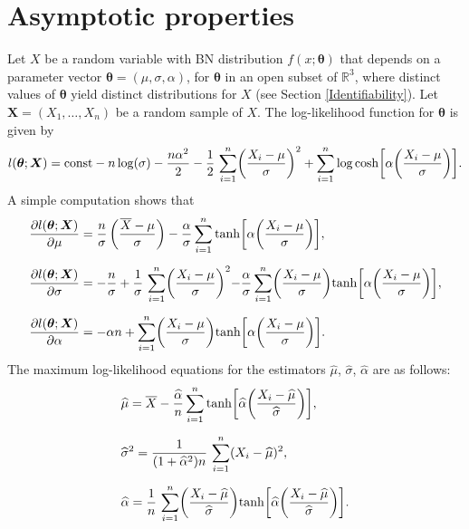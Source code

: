 \documentclass[12pt]{article}
\theoremstyle{definition}
\begin{document}
\section{Asymptotic properties}\label{sec:asymptot}
%
Let $X$ be a random variable with BN distribution $f(x;\boldsymbol{\theta})$ that depends on a parameter vector $\boldsymbol{\theta}= (\mu,\sigma,\alpha)$, for $\boldsymbol{\theta}$ in an open subset of $\mathbb{R}^3$, where
distinct values of $\boldsymbol{\theta}$ yield distinct distributions for $X$ (see Section \ref{Identifiability}).
Let $\boldsymbol{X}=(X_1,\ldots, X_n)$ be a random sample of $X$. The log-likelihood function for $\boldsymbol{\theta}$ is given by 
\begin{align*}
l(\boldsymbol{\theta};\boldsymbol{X})
=
{\rm const}-n\log(\sigma)-{n\alpha^2\over 2}
-{1\over 2}\, \sum_{i=1}^{n} \biggl({X_i-\mu\over\sigma}\biggr)^2
+
\sum_{i=1}^{n}\log\cosh\biggl[\alpha\biggl({X_i-\mu\over \sigma}\biggr)\biggr].
\end{align*}
A simple computation shows that
\begin{align}
&
{\partial l(\boldsymbol{\theta};\boldsymbol{X})\over \partial\mu}
=
{n\over \sigma}\, \biggl({\overline{X}-\mu\over\sigma}\biggr)
-
{\alpha\over\sigma}\sum_{i=1}^n {\rm tanh}\biggl[\alpha\biggl({ X_i-\mu\over \sigma}\biggl)\biggr], \label{score}
\\[0,2cm]
&
{\partial l(\boldsymbol{\theta};\boldsymbol{X})\over \partial\sigma}
=
-{n\over\sigma}
+
{1\over \sigma}\, \sum_{i=1}^{n} \biggl({X_i-\mu\over \sigma}\biggl)^2
-
{\alpha\over\sigma}\sum_{i=1}^n \biggl({X_i-\mu\over \sigma}\biggl) {\rm tanh}\biggl[\alpha\biggl({X_i-\mu\over \sigma}\bigg)\biggr], \label{score-1}
\\[0,2cm]
&
{\partial l(\boldsymbol{\theta};\boldsymbol{X})\over \partial\alpha}
=
-\alpha n+ \sum_{i=1}^n \biggl({X_i-\mu\over\sigma}\biggr) {\rm tanh}\biggl[\alpha\biggl({ X_i-\mu\over \sigma}\biggr)\biggr]. \label{score-2}
\end{align}
The maximum log-likelihood equations for the estimators $\widehat{\mu}$, $\widehat{\sigma}$, $\widehat{\alpha}$  are as follows:
\begin{align*}
& 
\widehat{\mu}
=
\overline{X}
-
{\widehat{\alpha}\over n}
\sum_{i=1}^n {\rm tanh}\biggl[\widehat{\alpha} \biggl({ X_i-\widehat{\mu}\over \widehat{\sigma}}\biggr)\biggr],
\\[0,2cm]
&
\widehat{\sigma}^2
=
{1\over (1+\widehat{\alpha}^2)n}\, 
\sum_{i=1}^{n} (X_i-\widehat{\mu})^2,
\\[0,2cm]
&\widehat{\alpha} =
{1\over n}\,
\sum_{i=1}^n \biggl({X_i-\widehat{\mu}\over\widehat{\sigma}}\biggr) {\rm tanh}\biggl[\widehat{\alpha}\biggl({ X_i-\widehat{\mu}\over \widehat{\sigma}}\biggr)\biggr].
\end{align*}
\end{document}
